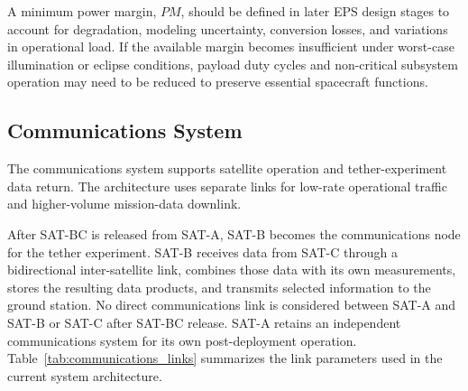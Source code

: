 A minimum power margin, \(PM\), should be defined in later EPS design stages to account for degradation, modeling uncertainty, conversion losses, and variations in operational load. If the available margin becomes insufficient under worst-case illumination or eclipse conditions, payload duty cycles and non-critical subsystem operation may need to be reduced to preserve essential spacecraft functions.


\subsection{Communications System}
\label{sub:communications_system}
The communications system supports satellite operation and tether-experiment data return. The architecture uses separate links for low-rate operational traffic and higher-volume mission-data downlink.

After SAT-BC is released from SAT-A, SAT-B becomes the communications node for the tether experiment. SAT-B receives data from SAT-C through a bidirectional inter-satellite link, combines those data with its own measurements, stores the resulting data products, and transmits selected information to the ground station. No direct communications link is considered between SAT-A and SAT-B or SAT-C after SAT-BC release. SAT-A retains an independent communications system for its own post-deployment operation. Table~\ref{tab:communications_links} summarizes the link parameters used in the current system architecture.

\begin{table}[htbp]
\centering
\caption{Communications links and reference sizing values for the LINKU mission.}
\label{tab:communications_links}
\small
{}
\end{table}

